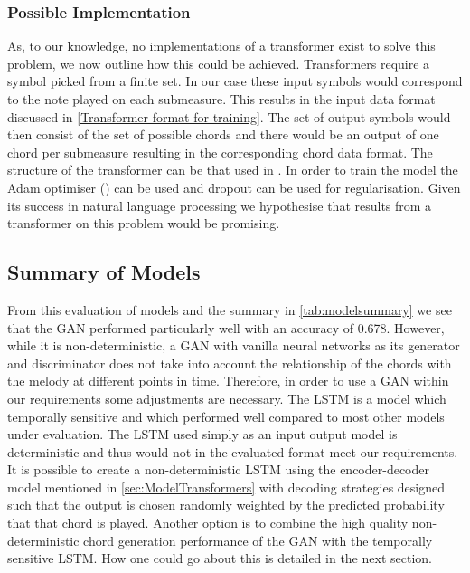\subsubsection{Possible Implementation}
As, to our knowledge, no implementations of a transformer exist to solve this problem, we now outline how this could be achieved.
Transformers require a symbol picked from a finite set. 
In our case these input symbols would correspond to the note played on each submeasure.
This results in the input data format discussed in \cref{Transformer format for training}.
The set of output symbols would then consist of the set of possible chords and there would be an output of one chord per submeasure resulting in the corresponding chord data format.
The structure of the transformer can be that used in \cite{Transformers}.
In order to train the model the Adam optimiser (\cite{Adam}) can be used and dropout can be used for regularisation.
Given its success in natural language processing we hypothesise that results from a transformer on this problem would be promising.

\subsection{Summary of Models}

From this evaluation of models and the summary in \cref{tab:modelsummary} we see that the GAN performed particularly well with an accuracy of 0.678.
However, while it is non-deterministic, a GAN  with vanilla neural networks as its generator and discriminator does not take into account the relationship of the chords with the melody at different points in time.
Therefore, in order to use a GAN within our requirements some adjustments are necessary.
The LSTM is a model which temporally sensitive and which performed well compared to most other models under evaluation.
The LSTM used simply as an input output model is deterministic and thus would not in the evaluated format meet our requirements.
It is possible to create a non-deterministic LSTM using the encoder-decoder model mentioned in \cref{sec:ModelTransformers} with decoding strategies designed such that the output is chosen randomly weighted by the predicted probability that that chord is played.
Another option is to combine the high quality non-deterministic chord generation performance of the GAN with the temporally sensitive LSTM.
How one could go about this is detailed in the next section.

